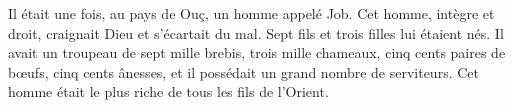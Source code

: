 Il était une fois, au pays de Ouç, un homme appelé Job.
	Cet homme, intègre et droit, craignait Dieu et s’écartait du mal.
Sept fils et trois filles lui étaient nés.
Il avait un troupeau de sept mille brebis, trois mille chameaux,
	cinq cents paires de bœufs, cinq cents ânesses,
	et il possédait un grand nombre de serviteurs.
Cet homme était le plus riche de tous les fils de l’Orient.
